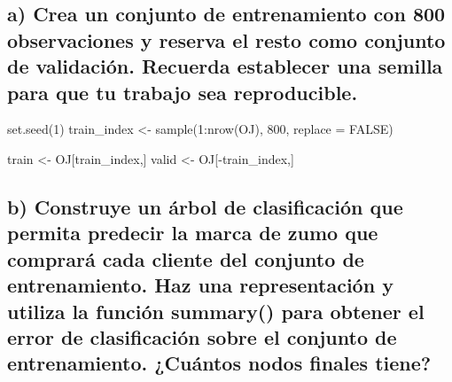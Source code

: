 \documentclass[
]{article}
\newenvironment{Shaded}{\begin{snugshade}}{\end{snugshade}}
\newcommand{\AttributeTok}[1]{\textcolor[rgb]{0.77,0.63,0.00}{#1}}
\newcommand{\ConstantTok}[1]{\textcolor[rgb]{0.00,0.00,0.00}{#1}}
\newcommand{\DecValTok}[1]{\textcolor[rgb]{0.00,0.00,0.81}{#1}}
\newcommand{\FunctionTok}[1]{\textcolor[rgb]{0.00,0.00,0.00}{#1}}
\newcommand{\NormalTok}[1]{#1}
\newcommand{\OtherTok}[1]{\textcolor[rgb]{0.56,0.35,0.01}{#1}}
\newcommand{\SpecialCharTok}[1]{\textcolor[rgb]{0.00,0.00,0.00}{#1}}
\begin{document}
\hypertarget{a-crea-un-conjunto-de-entrenamiento-con-800-observaciones-y-reserva-el-resto-como-conjunto-de-validaciuxf3n.-recuerda-establecer-una-semilla-para-que-tu-trabajo-sea-reproducible.}{%
\subsection{a) Crea un conjunto de entrenamiento con 800 observaciones y
reserva el resto como conjunto de validación. Recuerda establecer una
semilla para que tu trabajo sea
reproducible.}\label{a-crea-un-conjunto-de-entrenamiento-con-800-observaciones-y-reserva-el-resto-como-conjunto-de-validaciuxf3n.-recuerda-establecer-una-semilla-para-que-tu-trabajo-sea-reproducible.}}

\begin{Shaded}
\begin{Highlighting}[]
\FunctionTok{set.seed}\NormalTok{(}\DecValTok{1}\NormalTok{)}
\NormalTok{train\_index }\OtherTok{\textless{}{-}} \FunctionTok{sample}\NormalTok{(}\DecValTok{1}\SpecialCharTok{:}\FunctionTok{nrow}\NormalTok{(OJ), }\DecValTok{800}\NormalTok{, }\AttributeTok{replace =} \ConstantTok{FALSE}\NormalTok{)}

\NormalTok{train }\OtherTok{\textless{}{-}}\NormalTok{ OJ[train\_index,]}
\NormalTok{valid }\OtherTok{\textless{}{-}}\NormalTok{ OJ[}\SpecialCharTok{{-}}\NormalTok{train\_index,]}
\end{Highlighting}
\end{Shaded}

\hypertarget{b-construye-un-uxe1rbol-de-clasificaciuxf3n-que-permita-predecir-la-marca-de-zumo-que-compraruxe1-cada-cliente-del-conjunto-de-entrenamiento.-haz-una-representaciuxf3n-y-utiliza-la-funciuxf3n-summary-para-obtener-el-error-de-clasificaciuxf3n-sobre-el-conjunto-de-entrenamiento.-cuuxe1ntos-nodos-finales-tiene}{%
\subsection{b) Construye un árbol de clasificación que permita predecir
la marca de zumo que comprará cada cliente del conjunto de
entrenamiento. Haz una representación y utiliza la función summary()
para obtener el error de clasificación sobre el conjunto de
entrenamiento. ¿Cuántos nodos finales
tiene?}\label{b-construye-un-uxe1rbol-de-clasificaciuxf3n-que-permita-predecir-la-marca-de-zumo-que-compraruxe1-cada-cliente-del-conjunto-de-entrenamiento.-haz-una-representaciuxf3n-y-utiliza-la-funciuxf3n-summary-para-obtener-el-error-de-clasificaciuxf3n-sobre-el-conjunto-de-entrenamiento.-cuuxe1ntos-nodos-finales-tiene}}
\end{document}
